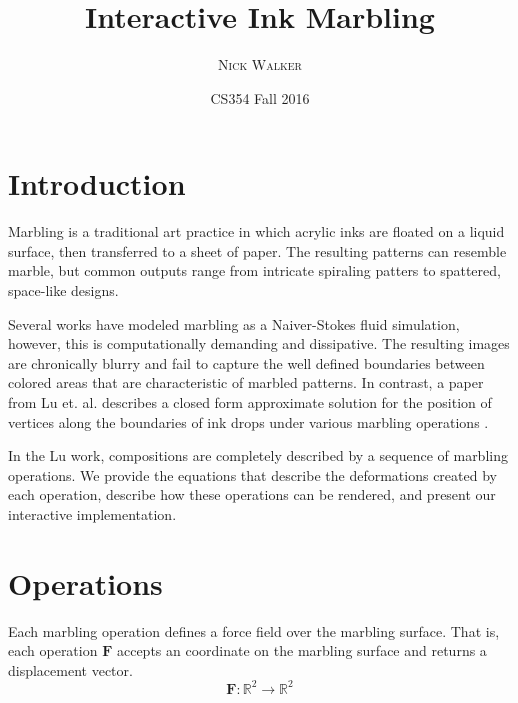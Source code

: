 \documentclass{article}
\title{Interactive Ink Marbling}
\author{\textsc{Nick Walker}}
\date{CS354 Fall 2016} %
\newcommand{\Fb}{\boldsymbol{F}}
\begin{document}
\twocolumn	
\maketitle %


\section{Introduction}

Marbling is a traditional art practice in which acrylic inks are floated on a liquid surface, then transferred to a sheet of paper. The resulting patterns can resemble marble, but common outputs range from intricate spiraling patters to spattered, space-like designs.

Several works have modeled marbling as a Naiver-Stokes fluid simulation, however, this is computationally demanding and dissipative. The resulting images are chronically blurry and fail to capture the well defined boundaries between colored areas that are characteristic of marbled patterns. In contrast, a paper from Lu et. al. describes a closed form approximate solution for the position of vertices along the boundaries of ink
drops under various marbling operations \cite{Shufang2012}.
 
In the Lu work, compositions are completely described by a sequence of marbling operations. We provide the equations that describe the deformations created by each operation, describe how these operations can be rendered, and present our interactive implementation.



\section{Operations}

Each marbling operation defines a force field over the marbling surface. That is, each operation $\Fb$ accepts an coordinate on the marbling surface and returns a displacement vector.
\begin{equation*}
		\Fb: \mathbb{R}^2 \rightarrow \mathbb{R}^2
\end{equation*}
\end{document}
